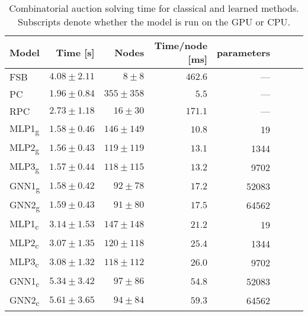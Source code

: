 \begin{scriptsize}
\begin{table}[ht]
	\centering
	\begin{tabular}{lrrrrrrr}
	    \toprule
		Model & Time [s] & Nodes  & Time/node [ms] & parameters \\
		\midrule
		FSB & $4.08 \pm 2.11$ & $8 \pm 8 $  & $462.6$ & --- \\
		PC  & $1.96 \pm 0.84$ & $355 \pm 358$ & $5.5$ & ---\\
		RPC & $2.73 \pm 1.18$ & $16 \pm 30$ & $ 171.1$ & ---\\
		\addlinespace
		MLP1\textsubscript{g} & $  1.58 \pm   0.46$ &  $ 146 \pm  149$ &  $  10.8$  & 19\\
		MLP2\textsubscript{g} & $  \mathbf{1.56 \pm   0.43}$ &  $ 119 \pm  119$ &  $  13.1$ & 1344\\
		MLP3\textsubscript{g} & $  1.57 \pm   0.44$ &  $ 118 \pm  115$ &  $  13.2$ & 9702\\
		GNN1\textsubscript{g} & $  1.58 \pm   0.42$ &  $  92 \pm   78$ &  $  17.2$ & 52083\\
		GNN2\textsubscript{g} & $  1.59 \pm   0.43$ &  $  91 \pm   80$ &  $  17.5$ & 64562\\
		\addlinespace
		MLP1\textsubscript{c} & $  3.14 \pm   1.53$ &  $ 147 \pm  148$ &  $  21.2$  & 19\\
		MLP2\textsubscript{c} & $  3.07 \pm   1.35$ &  $ 120 \pm  118$ &  $  25.4$ & 1344\\
		MLP3\textsubscript{c} & $  3.08 \pm   1.32$ &  $ 118 \pm  112$ &  $  26.0$ & 9702\\
		GNN1\textsubscript{c} & $  5.34 \pm   3.42$ &  $  97 \pm   86$ &  $  54.8$ & 52083\\
		GNN2\textsubscript{c} & $  5.61 \pm   3.65$ &  $  94 \pm   84$ &  $  59.3$ & 64562\\
		\bottomrule
	\end{tabular}
	\caption{Combinatorial auction solving time for classical and learned methods. Subscripts denote whether the model is run on the \gls{GPU} or \gls{CPU}.}\label{tab:results1_cauction}
\end{table}


\end{scriptsize}
